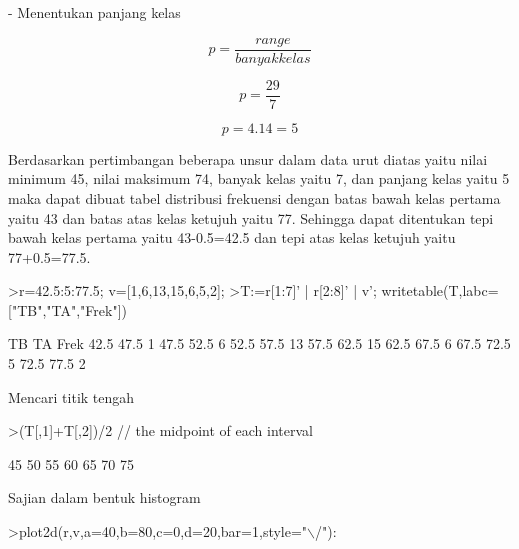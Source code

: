 \documentclass[12pt,arial,letterpaper]{book}
\begin{document}
\begin{eulernootebook}
\begin{eulercomment}
\begin{eulercomment}
\begin{eulernootebook}
\begin{eulercomment}
\begin{eulercomment}
\begin{eulercomment}
\begin{eulercomment}
\begin{eulercomment}
\begin{eulercomment}
\begin{eulercomment}
\begin{eulercomment}
\begin{eulercomment}
\begin{eulercomment}
\begin{eulercomment}
\begin{eulercomment}
\begin{eulercomment}
\begin{eulercomment}
- Menentukan panjang kelas\\
\end{eulercomment}
\begin{eulerformula}
\[
p=\frac {range}{banyak kelas}
\]
\end{eulerformula}
\begin{eulerformula}
\[
p=\frac {29}{7}
\]
\end{eulerformula}
\begin{eulerformula}
\[
p= 4.14=5
\]
\end{eulerformula}
\begin{eulercomment}
Berdasarkan pertimbangan beberapa unsur dalam data urut diatas yaitu
nilai minimum 45, nilai maksimum 74, banyak kelas yaitu 7, dan panjang
kelas yaitu 5 maka dapat dibuat tabel distribusi frekuensi dengan
batas bawah kelas pertama yaitu 43 dan batas atas kelas ketujuh yaitu
77. Sehingga dapat ditentukan tepi bawah kelas pertama yaitu
43-0.5=42.5 dan tepi atas kelas ketujuh yaitu 77+0.5=77.5.
\end{eulercomment}
\begin{eulerprompt}
>r=42.5:5:77.5; v=[1,6,13,15,6,5,2];
>T:=r[1:7]' | r[2:8]' | v'; writetable(T,labc=["TB","TA","Frek"])
\end{eulerprompt}
\begin{euleroutput}
          TB        TA      Frek
        42.5      47.5         1
        47.5      52.5         6
        52.5      57.5        13
        57.5      62.5        15
        62.5      67.5         6
        67.5      72.5         5
        72.5      77.5         2
\end{euleroutput}
\begin{eulercomment}
Mencari titik tengah
\end{eulercomment}
\begin{eulerprompt}
>(T[,1]+T[,2])/2 // the midpoint of each interval
\end{eulerprompt}
\begin{euleroutput}
         45 
         50 
         55 
         60 
         65 
         70 
         75 
\end{euleroutput}
\begin{eulercomment}
Sajian dalam bentuk histogram
\end{eulercomment}
\begin{eulerprompt}
>plot2d(r,v,a=40,b=80,c=0,d=20,bar=1,style="\(\backslash\)/"):
\end{eulerprompt}

\end{eulercomment}
\end{eulercomment}
\end{eulercomment}
\end{eulercomment}
\end{eulercomment}
\end{eulercomment}
\end{eulercomment}
\end{eulercomment}
\end{eulercomment}
\end{eulercomment}
\end{eulercomment}
\end{eulercomment}
\end{eulercomment}
\end{eulernootebook}
\end{eulercomment}
\end{eulercomment}
\end{eulernootebook}
\end{document}
